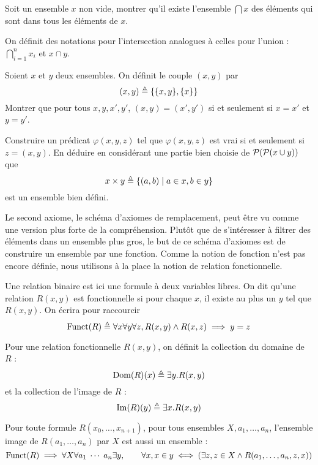 \begin{exercise}
  Soit un ensemble $x$ non vide, montrer qu'il existe l'ensemble $\bigcap x$ des
  éléments qui sont dans tous les éléments de $x$.
\end{exercise}

\begin{notation}
  On définit des notations pour l'intersection analogues à celles pour l'union :
  $\displaystyle\bigcap_{i = 1}^n x_i$ et $x \cap y$.
\end{notation}

\begin{exercise}\label{exo.ZF.prod}
  Soient $x$ et $y$ deux ensembles. On définit le couple $(x,y)$ par
  \[(x,y) \triangleq \{\{x,y\},\{x\}\}\]
  Montrer que pour tous $x,y,x',y'$, $(x,y) = (x',y')$ si et seulement si
  $x=x'$ et $y=y'$.

  Construire un prédicat $\varphi(x,y,z)$ tel que $\varphi(x,y,z)$ est vrai
  si et seulement si $z = (x,y)$. En déduire en considérant une partie bien
  choisie de $\mathcal{P} (\mathcal{P}(x\cup y))$ que
  \[x\times y \triangleq \{(a,b)\mid a \in x, b \in y\}\]
  est un ensemble bien défini.
\end{exercise}

Le second axiome, le schéma d'axiomes de remplacement, peut être vu comme une
version plus forte de la compréhension. Plutôt que de s'intéresser à filtrer des
éléments dans un ensemble plus gros, le but de ce schéma d'axiomes est de
construire un ensemble par une fonction. Comme la notion de fonction n'est pas
encore définie, nous utilisons à la place la notion de relation fonctionnelle.

\begin{definition}
  Une relation binaire est ici une formule à deux variables libres. On dit
  qu'une relation $R(x,y)$ est fonctionnelle si pour chaque $x$, il existe au
  plus un $y$ tel que $R(x,y)$. On écrira pour raccourcir
  \[\operatorname{Funct}(R) \triangleq \forall x\forall y\forall z, R(x,y)\land R(x,z)\implies
  y = z\]

  Pour une relation fonctionnelle $R(x,y)$, on définit la collection du domaine
  de $R$ :
  \[\operatorname{Dom}(R)(x)\triangleq \exists y. R(x,y)\]
  et la collection de l'image de $R$ :
  \[\operatorname{Im}(R)(y)\triangleq \exists x. R(x,y)\]
\end{definition}

\begin{axiom}
  Pour toute formule $R(x_0,\ldots,x_{n+1})$, pour tous ensembles
  $X,a_1,\ldots,a_n$, l'ensemble image de $R(a_1,\ldots,a_n)$ par $X$ est aussi
  un ensemble :
  \[\operatorname{Funct}(R)\implies \forall X \forall a_1\;\cdots\;a_n\exists y,\qquad
  \forall x, x \in y \iff (\exists z, z\in X \land R(a_1,\ldots,a_n,z,x))\]
\end{axiom}

